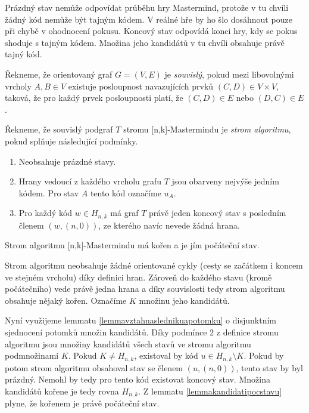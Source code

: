 Prázdný stav nemůže odpovídat průběhu hry Mastermind, protože v tu chvíli žádný kód nemůže být tajným kódem. V reálné hře by ho šlo dosáhnout pouze při chybě v ohodnocení pokusu. Koncový stav odpovídá konci hry, kdy se pokus shoduje s tajným kódem. Množina jeho kandidátů v tu chvíli obsahuje právě tajný kód. 
\begin{definice}
    Řekneme, že orientovaný graf $G=(V,E)$ je \emph{souvislý}, pokud mezi libovolnými vrcholy $A, B \in V$ existuje posloupnost navazujících prvků $(C,D) \in V \times V$, taková, že pro každý prvek posloupnosti platí, že $(C,D) \in E$ nebo $(D,C) \in E$.  
\end{definice}

\begin{definice}
  Řekneme, že souvislý podgraf $T$ stromu [n,k]-Mastermindu je \emph{strom algoritmu}, pokud splňuje následující podmínky.
  \begin{enumerate}
      \item Neobsahuje prázdné stavy.
      \item Hrany vedoucí z každého vrcholu grafu $T$ jsou obarveny nejvýše jedním kódem. Pro stav $A$ tento kód označíme $u_A$.
      \item Pro každý kód $w \in H_{n,k}$ má graf $T$ právě jeden koncový stav s posledním členem $(w, (n,0))$, ze kterého navíc nevede žádná hrana.
  \end{enumerate}
\end{definice}

\begin{tvrz}\label{tvrzkorenstromualg}
    Strom algoritmu [n,k]-Mastermindu má kořen a je jím počáteční stav. 
\end{tvrz}
\begin{dukaz}
    Strom algoritmu neobsahuje žádné orientované cykly (cesty se začátkem i koncem ve stejném vrcholu) díky definici hran.
    Zároveň do každého stavu (kromě počátečního) vede právě jedna hrana a díky souvislosti tedy strom algoritmu obsahuje nějaký kořen. Označíme $K$ množinu jeho kandidátů.

    Nyní využijeme lemmatu \ref{lemmavztahnaslednikuapotomku} o disjunktním sjednocení potomků množin kandidátů. Díky podmínce $2$ z definice stromu algoritmu jsou množiny kandidátů všech stavů ve stromu algoritmu podmnožinami $K$. Pokud $K \neq H_{n,k}$, existoval by kód $u \in H_{n,k} \setminus K$. Pokud by potom strom algoritmu obsahoval stav se členem $(u, (n,0))$, tento stav by byl prázdný. Nemohl by tedy pro tento kód existovat koncový stav. Množina kandidátů kořene je tedy rovna $H_{n,k}$. Z lemmatu \ref{lemmakandidatipocstavu} plyne, že kořenem je právě počáteční stav. 
\end{dukaz}


